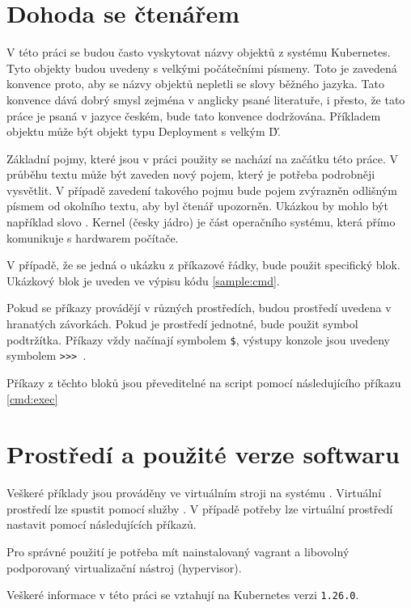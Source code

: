 \section{Dohoda se čtenářem}
V této práci se budou často vyskytovat názvy objektů z systému Kubernetes. Tyto objekty budou uvedeny s velkými počátečními písmeny. Toto je zavedená konvence proto, aby se názvy objektů nepletli se slovy běžného jazyka. Tato konvence dává dobrý smysl zejména v anglicky psané literatuře, i přesto, že tato práce je psaná v jazyce českém, bude tato konvence dodržována. Příkladem objektu může být objekt typu Deployment s velkým \'D\'.

Základní pojmy, které jsou v práci použity se nachází na začátku této práce. V průběhu textu může být zaveden nový pojem, který je potřeba podrobněji vysvětlit. V případě zavedení takového pojmu bude pojem zvýrazněn odlišným písmem od okolního textu, aby byl čtenář upozorněn. Ukázkou by mohlo být například slovo . Kernel (česky jádro) je část operačního systému, která přímo komunikuje s hardwarem počítače.  

V případě, že se jedná o ukázku z příkazové řádky, bude použit specifický blok. Ukázkový blok je uveden ve výpisu kódu \ref{sample:cmd}.

Pokud se příkazy provádějí v různých prostředích, budou prostředí uvedena v hranatých závorkách. Pokud je prostředí jednotné, bude použit symbol podtržítka. Příkazy vždy načínají symbolem \verb|$|, výstupy konzole jsou uvedeny symbolem \verb|>>> |.


Příkazy z těchto bloků jsou převeditelné na script pomocí následujícího příkazu \ref{cmd:exec} 


\section{Prostředí a použité verze softwaru}
Veškeré příklady jsou prováděny ve virtuálním stroji na systému . Virtuální prostředí lze spustit pomocí služby . V případě potřeby lze virtuální prostředí nastavit pomocí následujících příkazů.


Pro správné použití je potřeba mít nainstalovaný vagrant a libovolný podporovaný virtualizační nástroj (hypervisor).

Veškeré informace v této práci se vztahují na Kubernetes verzi \verb|1.26.0|.